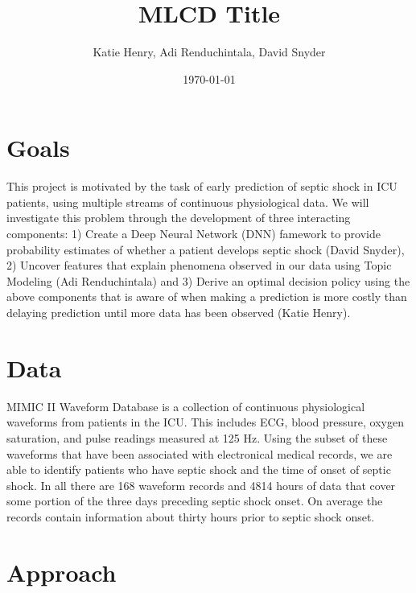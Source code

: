 \documentclass[dvips,12pt]{article}
\begin{document}

\title{MLCD Title}
\author{Katie Henry, Adi Renduchintala, David Snyder}
\date{\today}



\maketitle


\section{Goals}
This project is motivated by the task of early prediction of septic shock in ICU patients, using multiple streams of continuous physiological data. 
We will investigate this problem through the development of three interacting components:
1) Create a Deep Neural Network (DNN) famework to provide probability estimates of whether a patient develops septic shock (David Snyder),
2) Uncover features that explain phenomena observed in our data using Topic Modeling (Adi Renduchintala) and
3) Derive an optimal decision policy using the above components that is aware of when making a prediction is more costly than delaying prediction until more data has been observed (Katie Henry).


\section{Data}
MIMIC II Waveform Database is a collection of continuous physiological waveforms from patients in the ICU. This includes ECG, blood pressure, oxygen saturation, and pulse readings measured at 125 Hz. Using the subset of these waveforms that have been associated with electronical medical records, we are able to identify patients who have septic shock and the time of onset of septic shock. In all there are 168 waveform records and 4814 hours of data that cover some portion of the three days preceding septic shock onset. On average the records contain information about thirty hours prior to septic shock onset.

\section{Approach}
\end{document}
